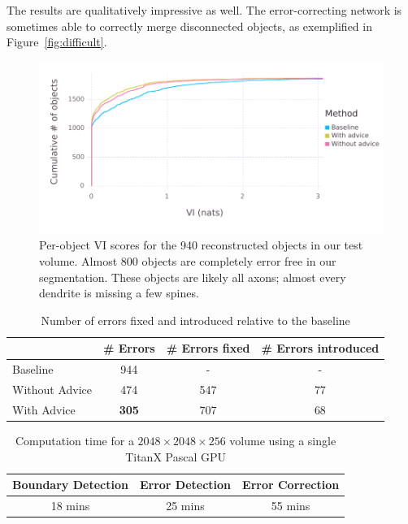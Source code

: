 \documentclass{article}
\begin{document}
The results are qualitatively impressive as well. The error-correcting network
is sometimes able to correctly merge disconnected objects, as exemplified in
Figure~\ref{fig:difficult}.

\begin{figure}
\begin{center}
\includegraphics[width=0.65\linewidth]{per_object_vi.pdf}
\caption{Per-object VI scores for the 940 reconstructed objects in our test volume. Almost 800 objects are completely error free in our segmentation. These objects are likely all axons; almost every dendrite is missing a few spines.}
\label{fig:decomp_vi_scores}
\end{center}
\end{figure}

\begin{table}[h]
  \caption{Number of errors fixed and introduced relative to the baseline}
  \label{table:errors_fixed}
  \centering
  \begin{tabular}{lccc}
    \toprule
	& \# Errors & \# Errors fixed & \# Errors introduced\\
    \midrule
    Baseline & 944 & - & - \\
    Without Advice & 474 & 547 & 77\\
	With Advice & \textbf{305} & 707 & 68\\
    \bottomrule
  \end{tabular}
\end{table}


\begin{table}[!h]
	\caption{Computation time for a $2048\times 2048\times 256$ volume using a single TitanX Pascal GPU}
\label{table:timing}
  \centering
  \begin{tabular}{ccc}
	  \toprule
	Boundary Detection & Error Detection & Error Correction\\
	\midrule
	18 mins & 25 mins & 55 mins\\
	\bottomrule
  \end{tabular}
\end{table}
\end{document}
